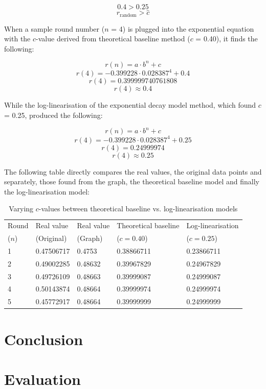 \begin{equation}
	0.4>0.25
\end{equation}
\begin{equation}
	r_{\text{random}}>\hat{c}
\end{equation}

When a sample round number ($n$ = 4) is plugged into the exponential equation with the $c$-value derived from theoretical baseline method ($c$ = 0.40), it finds the following:

\begin{equation}
	r(n)={a\cdot{b^{n}}+c}
\end{equation}
\begin{equation}
	r(4)={-0.399228\cdot{0.028387^{4}}+0.4}
\end{equation}
\begin{equation}
	r(4)=0.399999740761808
\end{equation}
\begin{equation}
	r(4)\approx{0.4}
\end{equation}

While the log-linearisation of the exponential decay model method, which found $c$ = 0.25, produced the following:

\begin{equation}
	r(n)={a\cdot{b^{n}}+c}
\end{equation}
\begin{equation}
	r(4)={-0.399228\cdot{0.028387^{4}}+0.25}
\end{equation}
\begin{equation}
	r(4)=0.24999974
\end{equation}
\begin{equation}
	r(4)\approx{0.25}
\end{equation}	

The following table directly compares the real values, the original data points and separately, those found from the graph, the theoretical baseline model and finally the log-linearisation model:

\begin{table}[H]
\centering
\begin{tabular}{lllll}
\toprule
Round & Real value & Real value & Theoretical baseline & Log-linearisation  \\
($n$) & (Original) & (Graph) & ($c=0.40$) & ($c=0.25$)\\
\midrule
1 & 0.47506717  & 0.4753  & 0.38866711 & 0.23866711 \\
2 & 0.49002285   & 0.48632  & 0.39967829 & 0.24967829\\
3 &  0.49726109  & 0.48663  & 0.39999087 & 0.24999087\\
4 &  0.50143874  &  0.48664 & 0.39999974 & 0.24999974\\
5 & 0.45772917  & 0.48664  & 0.39999999 & 0.24999999 \\
\bottomrule	
\end{tabular}
\caption{Varying $c$-values between theoretical baseline vs. log-linearisation models}
\label{tb:variables}
\end{table}



\section{Conclusion}




\section{Evaluation}
